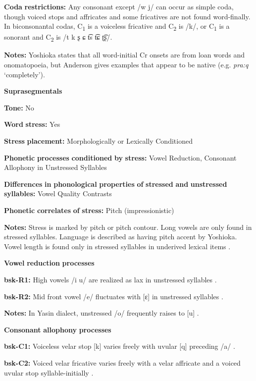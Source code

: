 \begin{styleBody}
\textbf{Coda} \textbf{restrictions:} Any consonant except /w j/ can occur as simple coda, though voiced stops and affricates and some fricatives are not found word-finally. In biconsonantal codas, C\textsubscript{1} is a voiceless fricative and C\textsubscript{2} is /k/, or C\textsubscript{1} is a sonorant and C\textsubscript{2} is /t k ʂ ɕ t͡s t͡ɕ ʈ͡ʂ/. 

\textbf{Notes:} Yoshioka states that all word-initial Cr onsets are from loan words and onomatopoeia, but Anderson gives examples that appear to be native (e.g. \textit{pra:q} ‘completely’).

\textbf{Suprasegmentals}

\textbf{Tone:} No

\textbf{Word} \textbf{stress:} Yes

\textbf{Stress} \textbf{placement:} Morphologically or Lexically Conditioned

\textbf{Phonetic} \textbf{processes} \textbf{conditioned} \textbf{by} \textbf{stress:} Vowel Reduction, Consonant Allophony in Unstressed Syllables

\textbf{Differences} \textbf{in} \textbf{phonological} \textbf{properties} \textbf{of} \textbf{stressed} \textbf{and} \textbf{unstressed} \textbf{syllables:} Vowel Quality Contrasts

\textbf{Phonetic} \textbf{correlates} \textbf{of} \textbf{stress:} Pitch (impressionistic)

\textbf{Notes:} Stress is marked by pitch or pitch contour. Long vowels are only found in stressed syllables. Language is described as having pitch accent by Yoshioka. Vowel length is found only in stressed syllables in underived lexical items \citep[1028]{Anderson1997}.

\textbf{Vowel} \textbf{reduction} \textbf{processes}

\textbf{bsk-R1:} High vowels /i u/ are realized as lax in unstressed syllables \citep[1029]{Anderson1997}.

\textbf{bsk-R2:} Mid front vowel /e/ fluctuates with [ɛ] in unstressed syllables \citep[1029]{Anderson1997}.

\textbf{Notes:} In Yasin dialect, unstressed /o/ frequently raises to [u] \citep[1038]{Anderson1997}.

\textbf{Consonant} \textbf{allophony} \textbf{processes}

\textbf{bsk-C1:} Voiceless velar stop [k] varies freely with uvular [q] preceding /a/ \citep[1025]{Anderson1997}.

\textbf{bsk-C2:} Voiced velar fricative varies freely with a velar affricate and a voiced uvular stop syllable-initially \citep[1025]{Anderson1997}.


\end{styleBody}
